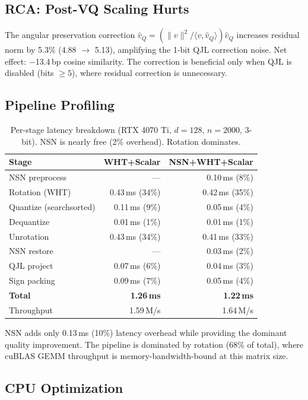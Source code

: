 \documentclass[sigconf,anonymous,review]{acmart}
\newcommand{\norm}[1]{\lVert #1 \rVert}
\newcommand{\inner}[2]{\langle #1, #2 \rangle}
\begin{document}
\subsection{RCA: Post-VQ Scaling Hurts}

The angular preservation correction
$\hat{v}_Q = (\norm{v}^2 / \inner{v}{\hat{v}_Q}) \hat{v}_Q$
increases residual norm by 5.3\% (4.88 $\to$ 5.13), amplifying
the 1-bit QJL correction noise. Net effect: $-$13.4\,bp cosine
similarity. The correction is beneficial only when QJL is disabled
(bits $\geq 5$), where residual correction is unnecessary.

\subsection{Pipeline Profiling}

\begin{table}[t]
\centering
\caption{Per-stage latency breakdown (RTX 4070 Ti, $d=128$, $n=2000$,
3-bit). NSN is nearly free (2\% overhead). Rotation dominates.}
\label{tab:profile}
\begin{tabular}{lrr}
\toprule
Stage & WHT+Scalar & NSN+WHT+Scalar \\
\midrule
NSN preprocess & --- & 0.10\,ms (8\%) \\
Rotation (WHT) & 0.43\,ms (34\%) & 0.42\,ms (35\%) \\
Quantize (searchsorted) & 0.11\,ms (9\%) & 0.05\,ms (4\%) \\
Dequantize & 0.01\,ms (1\%) & 0.01\,ms (1\%) \\
Unrotation & 0.43\,ms (34\%) & 0.41\,ms (33\%) \\
NSN restore & --- & 0.03\,ms (2\%) \\
QJL project & 0.07\,ms (6\%) & 0.04\,ms (3\%) \\
Sign packing & 0.09\,ms (7\%) & 0.05\,ms (4\%) \\
\midrule
\textbf{Total} & \textbf{1.26\,ms} & \textbf{1.22\,ms} \\
Throughput & 1.59\,M/s & 1.64\,M/s \\
\bottomrule
\end{tabular}
\end{table}

NSN adds only 0.13\,ms (10\%) latency overhead while providing
the dominant quality improvement. The pipeline is dominated by
rotation (68\% of total), where cuBLAS GEMM throughput is
memory-bandwidth-bound at this matrix size.

\subsection{CPU Optimization}
\end{document}
